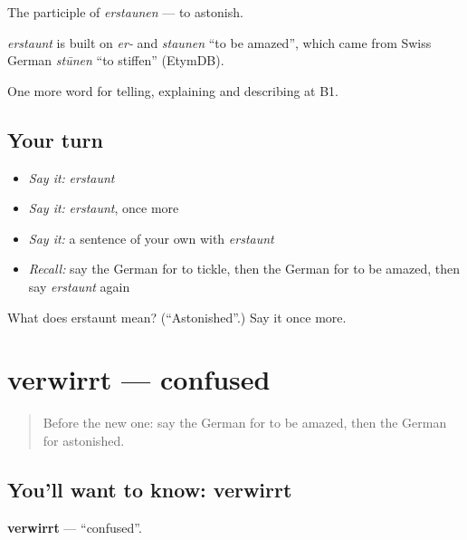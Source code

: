The participle of \emph{erstaunen} — to astonish.

\begin{cousinweb}
\emph{erstaunt} is built on \emph{er-} and \emph{staunen} \textquotedblleft{}to be amazed\textquotedblright{}, which came from Swiss German \emph{stūnen} \textquotedblleft{}to stiffen\textquotedblright{} (EtymDB).
\end{cousinweb}

\begin{grammarlens}[title={What you've built}]
One more word for telling, explaining and describing at B1.
\end{grammarlens}

\subsection*{Your turn}
\begin{itemize}
\raggedright
  \item \emph{Say it:} \emph{erstaunt}
  \item \emph{Say it:} \emph{erstaunt}, once more
  \item \emph{Say it:} a sentence of your own with \emph{erstaunt}
  \item \emph{Recall:} say the German for to tickle, then the German for to be amazed, then say \emph{erstaunt} again
\end{itemize}

\begin{tcolorbox}[breakable,colback=teal!4,colframe=teal!35!black,title={Before you move on}]
What does erstaunt mean? (\textquotedblleft{}Astonished\textquotedblright{}.) Say it once more.
\end{tcolorbox}
\section[verwirrt]{verwirrt — confused}

\label{lesson:GE-C474-verwirrt}



\begin{quote}
Before the new one: say the German for to be amazed, then the German for astonished.
\end{quote}

\subsection*{You'll want to know: verwirrt}
\textbf{verwirrt} — \textquotedblleft{}confused\textquotedblright{}.

